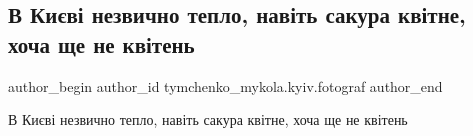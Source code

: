  
 
 
 
 
 
\subsection{В Києві незвично тепло, навіть сакура квітне, хоча ще не квітень}
\label{sec:03_01_2023.fb.tymchenko_mykola.kyiv.fotograf.1.kiev_teplo}
 
\ifcmt
 author_begin
   author_id tymchenko_mykola.kyiv.fotograf
 author_end
\fi

В Києві незвично тепло, навіть сакура квітне, хоча ще не квітень 🌺
